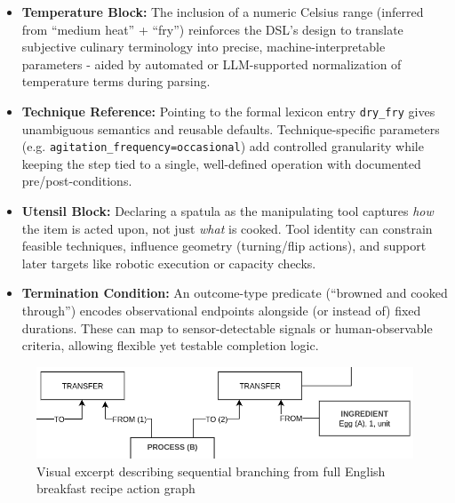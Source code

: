 \documentclass[sigconf]{acmart}
\begin{document}
\begin{itemize}
    \item \textbf{Temperature Block:} The inclusion of a numeric Celsius range (inferred from ``medium heat'' + ``fry'') reinforces the DSL's design to translate subjective culinary terminology into precise, machine-interpretable parameters - aided by automated or LLM-supported normalization of temperature terms during parsing.

    \item \textbf{Technique Reference:} Pointing to the formal lexicon entry \verb|dry_fry| gives unambiguous semantics and reusable defaults. Technique-specific parameters (e.g. \verb|agitation_frequency=occasional|) add controlled granularity while keeping the step tied to a single, well-defined operation with documented pre/post-conditions.

    \item \textbf{Utensil Block:} Declaring a spatula as the manipulating tool captures \emph{how} the item is acted upon, not just \emph{what} is cooked. Tool identity can constrain feasible techniques, influence geometry (turning/flip actions), and support later targets like robotic execution or capacity checks.

    \item \textbf{Termination Condition:} An outcome-type predicate (``browned and cooked through'') encodes observational endpoints alongside (or instead of) fixed durations. These can map to sensor-detectable signals or human-observable criteria, allowing flexible yet testable completion logic.
\end{itemize}

\begin{figure}[h]
  \centering
  \includegraphics[width=\linewidth]{images/sequencing.png}
  \caption{Visual excerpt describing sequential branching from full English breakfast recipe action graph}
  \label{fig:sequence}
\end{figure}
\end{document}

